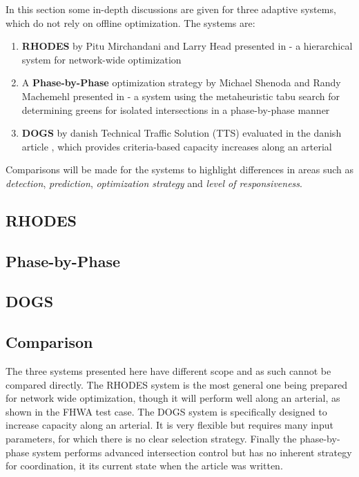 In this section some in-depth discussions are given for three adaptive systems, which do not rely on offline optimization. The systems are:

\begin{enumerate}
\item \textbf{RHODES} by Pitu Mirchandani and Larry Head presented in \cite{44} - a hierarchical system for network-wide optimization
\item A \textbf{Phase-by-Phase} optimization strategy by Michael Shenoda and Randy Machemehl presented in \cite{1} - a system using the metaheuristic tabu search for determining greens for isolated intersections in a phase-by-phase manner
\item \textbf{DOGS} by danish Technical Traffic Solution (TTS) evaluated in the danish article \cite{dogs}, which provides criteria-based capacity increases along an arterial
\end{enumerate}

Comparisons will be made for the systems to highlight differences in areas such as \textit{detection}, \textit{prediction}, \textit{optimization strategy} and \textit{level of responsiveness}.

\subsection{RHODES}


\subsection{Phase-by-Phase}


\subsection{DOGS}


\subsection{Comparison}
The three systems presented here have different scope and as such cannot be compared directly. The RHODES system is the most general one being prepared for network wide optimization, though it will perform well along an arterial, as shown in the FHWA test case. The DOGS system is specifically designed to increase capacity along an arterial. It is very flexible but requires many input parameters, for which there is no clear selection strategy. Finally the phase-by-phase system performs advanced intersection control but has no inherent strategy for coordination, it its current state when the article was written.

